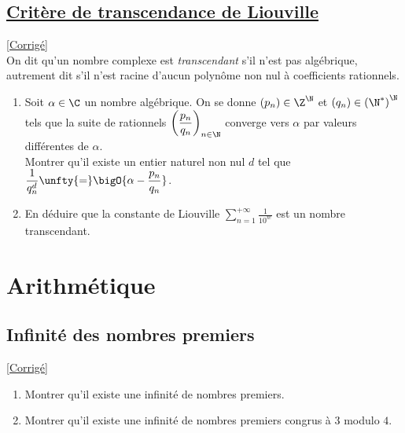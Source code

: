 \documentclass[8pt]{book}
\begin{document}
	\section{\underline{Critère de transcendance de Liouville} }
	\label{Critère de transcendance de Liouville}
	\textcolor{blue}{\hyperref[Critère de transcendance de Liouville corrigé]{[Corrigé]}}\\
	On dit qu'un nombre complexe est \textit{transcendant} s'il n'est pas algébrique, autrement dit s'il n'est racine d'aucun polynôme non nul à coefficients rationnels.
	\begin{enumerate}[leftmargin=*]
		\item Soit $\alpha\in\C$ un nombre algébrique. On se donne $(p_n)\in \Z^\N$ et $(q_n)\in \left(\N^*\right)^\N$ tels que la suite de rationnels $\displaystyle\left(\frac{p_n}{q_n}\right)_{n\in \N}$ converge
		vers $\alpha$ par valeurs différentes de $\alpha$.\\
		Montrer qu'il existe un entier naturel non nul $d$ tel que $\displaystyle\frac{1}{q_n^d}\unfty{=}\bigO{\alpha-\frac{p_n}{q_n}}$.
		\item En déduire que la constante de Liouville $\displaystyle\sum_{n=1}^{+\infty}\frac{1}{10^{n!}}$ est un nombre transcendant.
	\end{enumerate}
	
\chapter{Arithmétique}
\section{Infinité des nombres premiers }
\label{Infinité des nombres premiers}
\textcolor{blue}{\hyperref[Infinité des nombres premiers corrigé]{[Corrigé]}}\\
\begin{enumerate}[leftmargin=*]
	\item Montrer qu'il existe une infinité de nombres premiers.
	\item Montrer qu'il existe une infinité de nombres premiers congrus à $3$ modulo $4$.
\end{enumerate}
\end{document}

